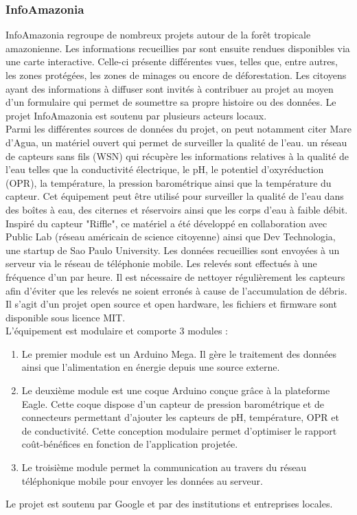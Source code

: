 \documentclass[10pt, conference, compsocconf]{llncs}
\begin{document}
		\subsubsection{InfoAmazonia}
			InfoAmazonia regroupe de nombreux projets autour de la forêt tropicale amazonienne. Les informations recueillies par sont ensuite rendues disponibles via une carte interactive. Celle-ci présente différentes vues, telles que, entre autres, les zones protégées, les zones de minages ou encore de déforestation. Les citoyens ayant des informations à diffuser sont invités à contribuer au projet au moyen d'un formulaire qui permet de soumettre sa propre histoire ou des données. Le projet InfoAmazonia est soutenu par plusieurs acteurs locaux. \\
			Parmi les différentes sources de données du projet, on peut notamment citer Mare d'Agua, un matériel ouvert qui permet de surveiller la qualité de l'eau. un réseau de capteurs sans fils (WSN) qui récupère les informations relatives à la qualité de l'eau telles que la conductivité électrique, le pH, le potentiel d'oxyréduction (OPR), la température, la pression barométrique ainsi que la température du capteur. Cet équipement peut être utilisé pour surveiller la qualité de l'eau dans des boîtes à eau, des citernes et réservoirs ainsi que les corps d'eau à faible débit. Inspiré du capteur "Riffle", ce matériel a été développé en collaboration avec Public Lab (réseau américain de science citoyenne) ainsi que Dev Technologia, une startup de Sao Paulo University. Les données recueillies sont envoyées à un serveur via le réseau de téléphonie mobile. Les relevés sont effectués à une fréquence d'un par heure. Il est nécessaire de nettoyer régulièrement les capteurs afin d'éviter que les relevés ne soient erronés à cause de l'accumulation de débris. Il s'agit d'un projet open source et open hardware, les fichiers et firmware sont disponible sous licence MIT. \\
			L'équipement est modulaire et comporte 3 modules :\\
			\begin{enumerate}
				\item Le premier module est un Arduino Mega. Il gère le traitement des données ainsi que l'alimentation en énergie depuis une source externe.
				\item Le deuxième module est une coque Arduino conçue grâce à la plateforme Eagle. Cette coque dispose d'un capteur de pression barométrique et de connecteurs permettant d'ajouter les capteurs de pH, température, OPR et de conductivité. Cette conception modulaire permet d'optimiser le rapport coût-bénéfices en fonction de l'application projetée.
				\item Le troisième module permet la communication au travers du réseau téléphonique mobile pour envoyer les données au serveur.
			\end{enumerate}
			Le projet est soutenu par Google et par des institutions et entreprises locales.
\end{document}
